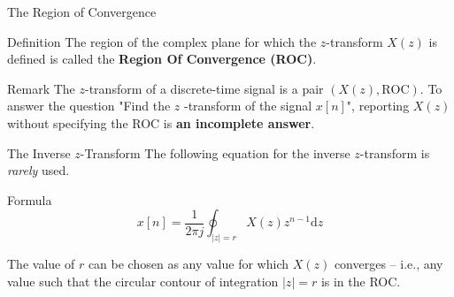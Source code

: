 \documentclass[aspectratio=169]{beamer}
\begin{document}
\begin{frame}{The Region of Convergence}
	\onslide<1->\begin{block}{Definition}
		The region of the complex plane for which the $ z $-transform $ X(z) $ is defined is called the \textbf{Region Of Convergence (ROC)}.
	\end{block}

	\begin{block}{Remark}
		The $ z $-transform of a discrete-time signal is a pair $ \left(X(z) , \mathrm{ROC}\right) $. To answer the question "Find the $ z $ -transform of the signal $ x[n] $", reporting $ X(z) $ without specifying the ROC is \textbf{an incomplete answer}.
	\end{block}
\end{frame}

\begin{frame}{The Inverse $ z $-Transform}
	The following equation for the inverse $ z $-transform is \textit{rarely} used.
	\begin{block}{Formula}
		\[x[n] = \frac{1}{2\pi j}\oint_{|z|=r}X(z)z^{n-1}\mathrm{d}z\]
	\end{block}
	The value of $ r $ can be chosen as any value for which $ X(z) $ converges -- i.e., any value such that the circular contour of integration $ |z| = r $
	is in the ROC.
\end{frame}
\end{document}
